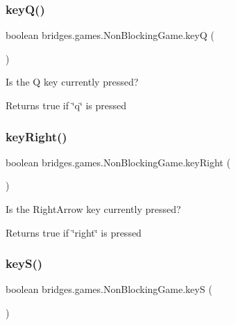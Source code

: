 \subsubsection{\texorpdfstring{key\+Q()}{keyQ()}}
{\footnotesize\ttfamily boolean bridges.\+games.\+Non\+Blocking\+Game.\+keyQ (\begin{DoxyParamCaption}{ }\end{DoxyParamCaption})\hspace{0.3cm}{\ttfamily [protected]}}



Is the Q key currently pressed? 

\begin{DoxyReturn}{Returns}
true if \char`\"{}q\char`\"{} is pressed 
\end{DoxyReturn}
\mbox{\label{classbridges_1_1games_1_1_non_blocking_game_a5a3db63942e995409daaf6b89f88b203}} 
\subsubsection{\texorpdfstring{key\+Right()}{keyRight()}}
{\footnotesize\ttfamily boolean bridges.\+games.\+Non\+Blocking\+Game.\+key\+Right (\begin{DoxyParamCaption}{ }\end{DoxyParamCaption})\hspace{0.3cm}{\ttfamily [protected]}}



Is the Right\+Arrow key currently pressed? 

\begin{DoxyReturn}{Returns}
true if \char`\"{}right\char`\"{} is pressed 
\end{DoxyReturn}
\mbox{\label{classbridges_1_1games_1_1_non_blocking_game_a4beb82246ef1eaf8c13aa406632ab936}} 
\subsubsection{\texorpdfstring{key\+S()}{keyS()}}
{\footnotesize\ttfamily boolean bridges.\+games.\+Non\+Blocking\+Game.\+keyS (\begin{DoxyParamCaption}{ }\end{DoxyParamCaption})\hspace{0.3cm}{\ttfamily [protected]}}




